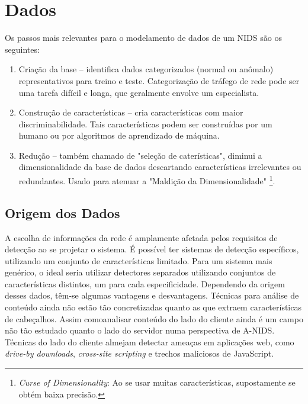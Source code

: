 \chapter{Dados}
\label{dados}
Os passos mais relevantes para o modelamento de dados de um NIDS são os seguintes:
\begin{enumerate}
    \item Criação da base -- identifica dados categorizados (normal ou anômalo) representativos para treino e teste.
    Categorização de tráfego de rede pode ser uma tarefa difícil e longa, que geralmente envolve um especialista.
    \item Construção de características -- cria características com maior discriminabilidade. Tais características
    podem ser construídas por um humano ou por algoritmos de aprendizado de máquina.
    \item Redução -- também chamado de "seleção de caterísticas", diminui a dimensionalidade da base de dados
    descartando características irrelevantes ou redundantes. Usado para atenuar a "Maldição da Dimensionalidade"
    \footnote{\textit{Curse of Dimensionality}: Ao se usar muitas características,
    supostamente se obtém baixa precisão.}.
\end{enumerate}


\section{Origem dos Dados}
A escolha de informações da rede é amplamente afetada pelos requisitos de detecção ao se projetar o sistema.
É possível ter sistemas de detecção específicos, utilizando um conjunto de características limitado.
Para um sistema mais genérico, o ideal seria utilizar detectores separados utilizando conjuntos de características
distintos, um para cada especificidade. Dependendo da origem desses dados, têm-se algumas vantagens e desvantagens.
Técnicas para análise de conteúdo ainda não estão tão concretizadas quanto as que extraem características de
cabeçalhos. Assim comoanalisar conteúdo do lado do cliente ainda é um campo não tão estudado quanto o lado do servidor
numa perspectiva de A-NIDS. Técnicas do lado do cliente almejam detectar ameaças em aplicações web, como \textit{drive-by
downloads}, \textit{cross-site scripting} e trechos maliciosos de JavaScript.

